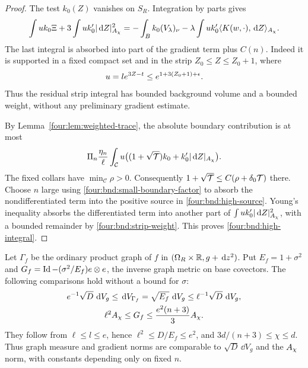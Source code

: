 \begin{proof}
The test $k_0(Z)$ vanishes on $S_R$.  Integration by parts gives
\begin{align*}
 \int u k_0\Xi+3\int u k_0'|\,\mathrm d Z|_{A_\chi}^2
 =-\int_B k_0(V_\lambda)_\nu
  -\lambda\int u k_0'
       \langle K(w,\cdot),\,\mathrm d Z\rangle_{A_\chi}.
\end{align*}
The last integral is absorbed into part of the gradient term plus
$C(n)$.  Indeed it is supported in a fixed compact set and in the
strip $Z_0\le Z\le Z_0+1$, where
\begin{equation}\label{four:bnd:strip-weight}
 u=l e^{3Z-t}\le e^{1+3(Z_0+1)+\epsilon}.
\end{equation}
Thus the residual strip integral has bounded background volume
and a bounded weight, without any preliminary gradient estimate.

By Lemma~\ref{four:lem:weighted-trace}, the absolute boundary contribution
is at most
\[
 \Pi_n\frac{\eta_n}{\ell}
 \int_{\mathcal C}u
 \bigl((1+\sqrt{\mathcal T})k_0+k_0'|\,\mathrm d Z|_{A_\chi}\bigr).
\]
The fixed collars have $\min_{\mathcal C}\rho>0$.  Consequently
$1+\sqrt{\mathcal T}\le C(\rho+\delta_0\mathcal T)$ there.
Choose $n$ large using \eqref{four:bnd:small-boundary-factor} to absorb
the nondifferentiated term into the positive source in
\eqref{four:bnd:high-source}.  Young's inequality absorbs the differentiated
term into another part of $\int u k_0'|\,\mathrm d Z|_{A_\chi}^2$, with
a bounded remainder by \eqref{four:bnd:strip-weight}.  This proves
\eqref{four:bnd:high-integral}.
\end{proof}

Let $\Gamma_f$ be the ordinary product graph of $f$ in
$(\Omega_R\times\mathbb R,g+\,\mathrm d z^2)$.  Put $E_f=1+\sigma^2$ and
$G_f=\operatorname{Id}-(\sigma^2/E_f)e\otimes e$, the inverse graph metric
on base covectors.  The following comparisons hold without a
bound for $\sigma$:
\begin{equation}\label{four:bnd:graph-comparison}
 \begin{gathered}
 e^{-1}\sqrt D\,\,\mathrm d V_g\le\,\mathrm d V_{\Gamma_f}
       =\sqrt{E_f}\,\,\mathrm d V_g\le\ell^{-1}\sqrt D\,\,\mathrm d V_g,\\
 \ell^2A_\chi\le G_f\le\frac{e^2(n+3)}3A_\chi.
 \end{gathered}
\end{equation}
They follow from $\ell\le l\le e$, hence
$\ell^2\le D/E_f\le e^2$, and
$3d/(n+3)\le\chi\le d$.  Thus graph measure and gradient norms
are comparable to $\sqrt D\,\dd V_g$ and the $A_\chi$ norm,
with constants depending only on fixed $n$.

